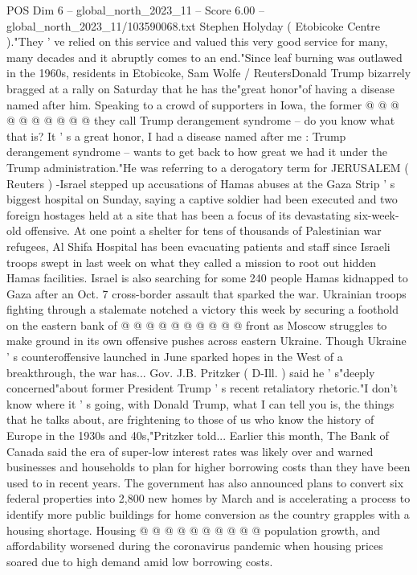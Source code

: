 \begin{textsample}{POS Dim 6 – global\_north\_2023\_11 – Score 6.00 – global\_north\_2023\_11/103590068.txt}
Stephen Holyday ( Etobicoke Centre )."They ' ve relied on this service and valued this very good service for many, many decades and it abruptly comes to an end."Since leaf burning was outlawed in the 1960s, residents in Etobicoke, Sam Wolfe / ReutersDonald Trump bizarrely bragged at a rally on Saturday that he has the"great honor"of having a disease named after him.
Speaking to a crowd of supporters in Iowa, the former @ @ @ @ @ @ @ @ @ @ they call Trump derangement syndrome -- do you know what that is?
It ' s a great honor, I had a disease named after me : Trump derangement syndrome -- wants to get back to how great we had it under the Trump administration."He was referring to a derogatory term for JERUSALEM ( Reuters ) -Israel stepped up accusations of Hamas abuses at the Gaza Strip ' s biggest hospital on Sunday, saying a captive soldier had been executed and two foreign hostages held at a site that has been a focus of its devastating six-week-old offensive.
At one point a shelter for tens of thousands of Palestinian war refugees, Al Shifa Hospital has been evacuating patients and staff since Israeli troops swept in last week on what they called a mission to root out hidden Hamas facilities.
Israel is also searching for some 240 people Hamas kidnapped to Gaza after an Oct. 7 cross-border assault that sparked the war.
Ukrainian troops fighting through a stalemate notched a victory this week by securing a foothold on the eastern bank of @ @ @ @ @ @ @ @ @ @ front as Moscow struggles to make ground in its own offensive pushes across eastern Ukraine.
Though Ukraine ' s counteroffensive launched in June sparked hopes in the West of a breakthrough, the war has...
Gov.
J.B.
Pritzker ( D-Ill. ) said he ' s"deeply concerned"about former President Trump ' s recent retaliatory rhetoric."I don't know where it ' s going, with Donald Trump, what I can tell you is, the things that he talks about, are frightening to those of us who know the history of Europe in the 1930s and 40s,"Pritzker told...
Earlier this month, The Bank of Canada said the era of super-low interest rates was likely over and warned businesses and households to plan for higher borrowing costs than they have been used to in recent years.
The government has also announced plans to convert six federal properties into 2,800 new homes by March and is accelerating a process to identify more public buildings for home conversion as the country grapples with a housing shortage.
Housing @ @ @ @ @ @ @ @ @ @ population growth, and affordability worsened during the coronavirus pandemic when housing prices soared due to high demand amid low borrowing costs.

\end{textsample}
